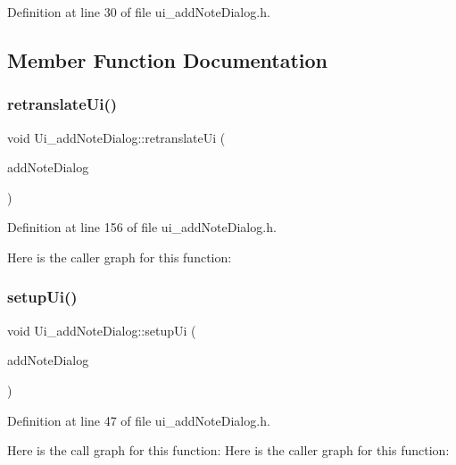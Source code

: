 Definition at line 30 of file ui\+\_\+add\+Note\+Dialog.\+h.



\subsection{Member Function Documentation}
\hypertarget{classUi__addNoteDialog_aab12c63dbd7ceae65cefd5be2a09c2ab}{}\label{classUi__addNoteDialog_aab12c63dbd7ceae65cefd5be2a09c2ab} 
\subsubsection{\texorpdfstring{retranslate\+Ui()}{retranslateUi()}}
{\footnotesize\ttfamily void Ui\+\_\+add\+Note\+Dialog\+::retranslate\+Ui (\begin{DoxyParamCaption}\item[{Q\+Widget $\ast$}]{add\+Note\+Dialog }\end{DoxyParamCaption})\hspace{0.3cm}{\ttfamily [inline]}}



Definition at line 156 of file ui\+\_\+add\+Note\+Dialog.\+h.

Here is the caller graph for this function\+:
\hypertarget{classUi__addNoteDialog_a2487f1cd1542da959f06b7412e80ef0b}{}\label{classUi__addNoteDialog_a2487f1cd1542da959f06b7412e80ef0b} 
\subsubsection{\texorpdfstring{setup\+Ui()}{setupUi()}}
{\footnotesize\ttfamily void Ui\+\_\+add\+Note\+Dialog\+::setup\+Ui (\begin{DoxyParamCaption}\item[{Q\+Widget $\ast$}]{add\+Note\+Dialog }\end{DoxyParamCaption})\hspace{0.3cm}{\ttfamily [inline]}}



Definition at line 47 of file ui\+\_\+add\+Note\+Dialog.\+h.

Here is the call graph for this function\+:
Here is the caller graph for this function\+:


